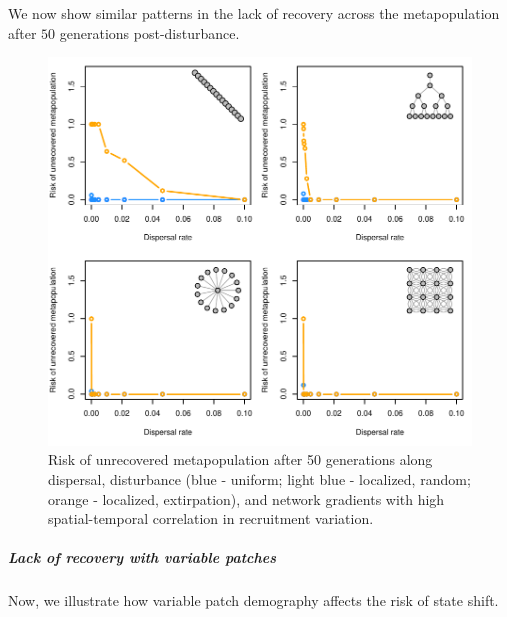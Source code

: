 \documentclass[]{article}
\let\oldsubparagraph\subparagraph
\renewcommand{\subparagraph}[1]{\oldsubparagraph{#1}\mbox{}}
\begin{document}
We now show similar patterns in the lack of recovery across the
metapopulation after \(50\) generations post-disturbance.

\begin{figure}[H]

{\centering \includegraphics{Managing_for_ecological_surprises_in_metapopulations_makeHTML_files/figure-latex/Recovery-1} 

}

\caption{Risk of unrecovered metapopulation after 50 generations along dispersal, disturbance (blue - uniform; light blue - localized, random; orange - localized, extirpation), and network gradients with high spatial-temporal correlation in recruitment variation.}\label{fig:Recovery}
\end{figure}

\hypertarget{lack-of-recovery-with-variable-patches}{%
\subparagraph{Lack of recovery with variable
patches}\label{lack-of-recovery-with-variable-patches}}

Now, we illustrate how variable patch demography affects the risk of
state shift.
\end{document}
